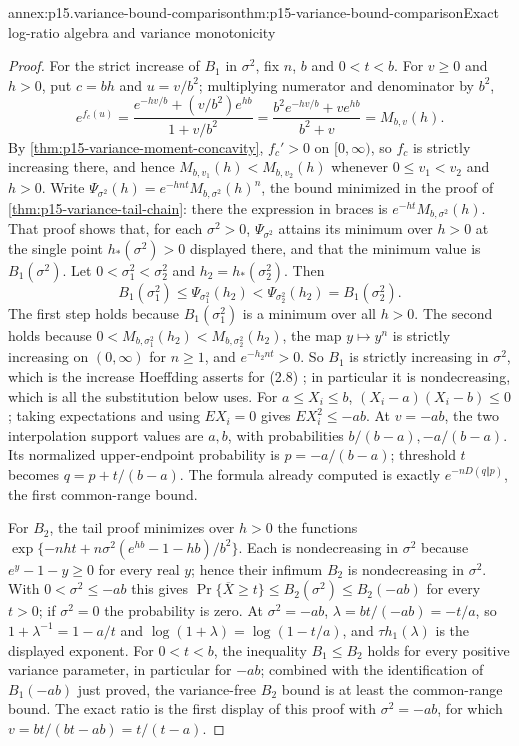 \begin{annexitem}{annex:p15.variance-bound-comparison}{thm:p15-variance-bound-comparison}{Exact log-ratio algebra and variance monotonicity}
\begin{proof}
For the strict increase of \(B_1\) in \(\sigma^2\), fix \(n\), \(b\) and
\(0<t<b\). For \(v\geq0\) and \(h>0\), put \(c=bh\) and \(u=v/b^2\);
multiplying numerator and denominator by \(b^2\),
\[
 e^{f_c(u)}=\frac{e^{-hv/b}+(v/b^2)e^{hb}}{1+v/b^2}
 =\frac{b^2e^{-hv/b}+ve^{hb}}{b^2+v}=M_{b,v}(h).
\]
By \cref{thm:p15-variance-moment-concavity}, \(f_c'>0\) on \([0,\infty)\),
so \(f_c\) is strictly increasing there, and hence
\(M_{b,v_1}(h)<M_{b,v_2}(h)\) whenever \(0\leq v_1<v_2\) and \(h>0\).
Write \(\Psi_{\sigma^2}(h)=e^{-hnt}M_{b,\sigma^2}(h)^n\), the bound minimized
in the proof of \cref{thm:p15-variance-tail-chain}: there the expression
in braces is \(e^{-ht}M_{b,\sigma^2}(h)\). That proof shows that, for each
\(\sigma^2>0\), \(\Psi_{\sigma^2}\) attains its minimum over \(h>0\) at the
single point \(h_*(\sigma^2)>0\) displayed there, and that the minimum
value is \(B_1(\sigma^2)\). Let \(0<\sigma_1^2<\sigma_2^2\) and
\(h_2=h_*(\sigma_2^2)\). Then
\[
 B_1(\sigma_1^2)\leq\Psi_{\sigma_1^2}(h_2)
 <\Psi_{\sigma_2^2}(h_2)=B_1(\sigma_2^2).
\]
The first step holds because \(B_1(\sigma_1^2)\) is a minimum over all
\(h>0\). The second holds because \(0<M_{b,\sigma_1^2}(h_2)<M_{b,\sigma_2^2}(h_2)\),
the map \(y\mapsto y^n\) is strictly increasing on \((0,\infty)\) for
\(n\geq1\), and \(e^{-h_2nt}>0\). So \(B_1\) is strictly increasing in
\(\sigma^2\), which is the increase Hoeffding asserts for (2.8)
\cite[p.~20]{Hoeffding1963BoundedSums}; in particular it is
nondecreasing, which is all the substitution below uses.
For \(a\leq X_i\leq b\),
\((X_i-a)(X_i-b)\leq0\); taking expectations and using \(EX_i=0\)
gives \(EX_i^2\leq-ab\).
At \(v=-ab\), the two interpolation support values are \(a,b\),
with probabilities \(b/(b-a),-a/(b-a)\).
Its normalized upper-endpoint probability is \(p=-a/(b-a)\);
threshold \(t\) becomes \(q=p+t/(b-a)\).
The formula already computed is exactly
\(e^{-nD(q\Vert p)}\), the first common-range bound.

For \(B_2\), the tail proof minimizes over \(h>0\) the functions
\(\exp\{-nht+n\sigma^2(e^{hb}-1-hb)/b^2\}\). Each is nondecreasing in
\(\sigma^2\) because \(e^y-1-y\geq0\) for every real \(y\); hence their
infimum \(B_2\) is nondecreasing in \(\sigma^2\). With
\(0<\sigma^2\leq-ab\) this gives
\(\Pr\{\overline X\geq t\}\leq B_2(\sigma^2)\leq B_2(-ab)\) for every
\(t>0\); if \(\sigma^2=0\) the probability is zero.
At \(\sigma^2=-ab\), \(\lambda=bt/(-ab)=-t/a\), so
\(1+\lambda^{-1}=1-a/t\) and \(\log(1+\lambda)=\log(1-t/a)\), and
\(\tau h_1(\lambda)\) is the displayed exponent.
For \(0<t<b\), the inequality \(B_1\leq B_2\) holds for every positive
variance parameter, in particular for \(-ab\); combined with the
identification of \(B_1(-ab)\) just proved, the variance-free \(B_2\)
bound is at least the common-range bound.
The exact ratio is the first display of this proof with
\(\sigma^2=-ab\), for which \(v=bt/(bt-ab)=t/(t-a)\).


\end{proof}
\end{annexitem}
